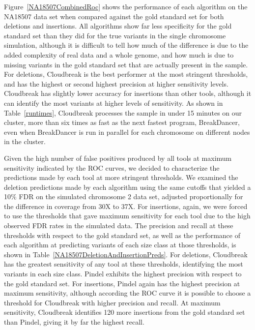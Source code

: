 \documentclass [11pt] {report}
\begin{document}
Figure~\ref{NA18507CombinedRoc} shows the performance of each algorithm on the NA18507 data set when compared against the gold standard set for both deletions and insertions. All algorithms show far less specificity for the gold standard set than they did for the true variants in the single chromosome simulation, although it is difficult to tell how much of the difference is due to the added complexity of real data and a whole genome, and how much is due to missing variants in the gold standard set that are actually present in the sample. For deletions, Cloudbreak is the best performer at the most stringent thresholds, and has the highest or second highest precision at higher sensitivity levels. Cloudbreak has slightly lower accuracy for insertions than other tools, although it can identify the most variants at higher levels of sensitivity. As shown in Table~\ref{runtimes}, Cloudbreak processes the sample in under 15 minutes on our cluster, more than six times as fast as the next fastest program, BreakDancer, even when BreakDancer is run in parallel for each chromosome on different nodes in the cluster.

Given the high number of false positives produced by all tools at maximum sensitivity indicated by the ROC curves, we decided to characterize the predictions made by each tool at more stringent thresholds. We examined the deletion predictions made by each algorithm using the same cutoffs that yielded a 10\% FDR on the simulated chromosome 2 data set, adjusted proportionally for the difference in coverage from 30X to 37X. For insertions, again, we were forced to use the thresholds that gave maximum sensitivity for each tool due to the high observed FDR rates in the simulated data. The precision and recall at these thresholds with respect to the gold standard set, as well as the performance of each algorithm at predicting variants of each size class at those thresholds, is shown in Table~\ref{NA18507DeletionAndInsertionPreds}. For deletions, Cloudbreak has the greatest sensitivity of any tool at these thresholds, identifying the most variants in each size class. Pindel exhibits the highest precision with respect to the gold standard set. For insertions, Pindel again has the highest precision at maximum sensitivity, although according the ROC curve it is possible to choose a threshold for Cloudbreak with higher precision and recall. At maximum sensitivity, Cloudbreak identifies 120 more insertions from the gold standard set than Pindel, giving it by far the highest recall.
\end{document}
